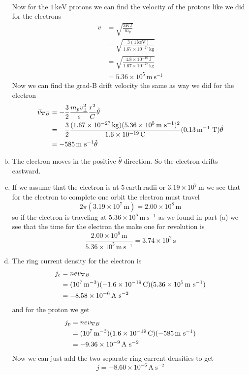 \documentclass[11pt]{article}
\numberwithin{equation}{section}
\newcommand{\grad}{\bold\nabla}
\newcommand{\unit}[1]{\ensuremath{\, \mathrm{#1}}}
\begin{document}
\begin{enumerate}[(a)]
\begin{align*}
\end{align*}
Now for the $1\unit{keV}$ protons we can find the velocity of the protons like we did for the electrons
\begin{align*}
v &= \sqrt{\frac{3KT}{m_p}}\\
&= \sqrt{\frac{3(1\unit{keV})}{1.67\times10^{-27}\unit{kg}}}\\
&= \sqrt{\frac{4.8\times10^{-16}\unit{J}}{1.67\times10^{-27}\unit{kg}}}\\
&= 5.36\times10^{5}\unit{m\ s^{-1}}
\end{align*}
Now we can find the grad-B drift velocity the same as way we did for the electron 
\begin{align*}
\vec{v}_{\grad B} &= -\frac{3}{2}\frac{m_pv_{\perp}^2}{e}\frac{r^2}{C}\hat{\theta}\\
&= -\frac{3}{2}\frac{(1.67\times10^{-27}\unit{kg})(5.36\times10^{5}\unit{m\ s^{-1}})^2}{1.6\times10^{-19}\unit{C}}(0.13\unit{m^{-1}\ T})\hat{\theta}\\
&= -585\unit{m\ s^{-1}}\hat{\theta}
\end{align*}

\item
The electron moves in the positive $\hat{\theta}$ direction. So the electron drifts eastward.

\item
If we assume that the electron is at $5\unit{earth\ radii}$ or $3.19\times10^{7}\unit{m}$ we see that for the electron to complete one orbit the electron must travel
$$2\pi(3.19\times10^{7}\unit{m}) = 2.00\times10^{8}\unit{m}$$
so if the electron is traveling at $5.36\times10^{5}\unit{m\ s^{-1}}$ as we found in part (a) we see that the time for the electron the make one for revolution is 
$$\frac{2.00\times10^{8}\unit{m}}{5.36\times10^{5}\unit{m\ s^{-1}}} = 3.74\times10^{2}\unit{s}$$

\item
The ring current density for the electron is
\begin{align*}
j_{e} &= nev_{\grad B}\\
&= (10^{7}\unit{m^{-3}})(-1.6\times10^{-19}\unit{C})(5.36\times10^{5}\unit{m\ s^{-1}})\\
&= -8.58\times10^{-6}\unit{A\ s^{-2}}
\end{align*}
and for the proton we get
\begin{align*}
j_{p} &= nev_{\grad B}\\
&= (10^{7}\unit{m^{-3}})(1.6\times10^{-19}\unit{C})(-585\unit{m\ s^{-1}})\\
&= -9.36\times10^{-9}\unit{A\ s^{-2}}
\end{align*}
Now we can just add the two separate ring current densities to get
$$j = -8.60\times10^{-6}\unit{A\ s^{-2}}$$
\end{enumerate}
\end{document}
